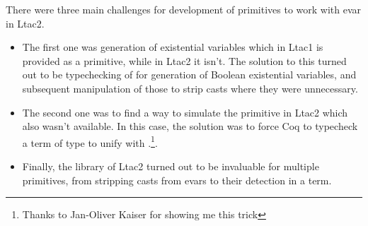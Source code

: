 There were three main challenges for development of primitives to work with evar in Ltac2.
\begin{itemize}
\item The first one was generation of existential variables which in Ltac1 is provided as a primitive, while in Ltac2 it isn't.
  The solution to this turned out to be typechecking of  for generation of Boolean existential variables, and subsequent manipulation of those to strip casts where they were unnecessary.
\item The second one was to find a way to simulate the  primitive in Ltac2 which also wasn't available.
  In this case, the solution was to force Coq to typecheck a term of type  to unify  with .\footnote{Thanks to Jan-Oliver Kaiser for showing me this trick}.
\item Finally, the  library of Ltac2 turned out to be invaluable for multiple primitives, from stripping casts from evars to their detection in a term.
\end{itemize}

